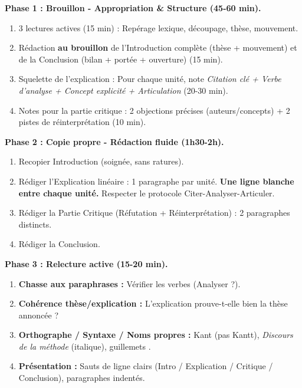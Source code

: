 \documentclass[11pt]{article}
\begin{document}
\begin{methode}
    \textbf{Phase 1 : Brouillon - Appropriation \& Structure (45-60 min).}
    \begin{enumerate}
        \item 3 lectures actives (15 min) : Repérage lexique, découpage, thèse, mouvement.
        \item Rédaction \textbf{au brouillon} de l'Introduction complète (thèse + mouvement) et de la Conclusion (bilan + portée + ouverture) (15 min).
        \item Squelette de l'explication : Pour chaque unité, note \emph{Citation clé + Verbe d'analyse + Concept explicité + Articulation} (20-30 min).
        \item Notes pour la partie critique : 2 objections précises (auteurs/concepts) + 2 pistes de réinterprétation (10 min).
    \end{enumerate}
    \textbf{Phase 2 : Copie propre - Rédaction fluide (1h30-2h).}
    \begin{enumerate}
        \item Recopier Introduction (soignée, sans ratures).
        \item Rédiger l'Explication linéaire : 1 paragraphe par unité. \textbf{Une ligne blanche entre chaque unité.} Respecter le protocole Citer-Analyser-Articuler.
        \item Rédiger la Partie Critique (Réfutation + Réinterprétation) : 2 paragraphes distincts.
        \item Rédiger la Conclusion.
    \end{enumerate}
    \textbf{Phase 3 : Relecture active (15-20 min).}
    \begin{enumerate}
        \item \textbf{Chasse aux paraphrases :} Vérifier les verbes (Analyser ?).
        \item \textbf{Cohérence thèse/explication :} L'explication prouve-t-elle bien la thèse annoncée ?
        \item \textbf{Orthographe / Syntaxe / Noms propres :} Kant (pas Kantt), \emph{Discours de la méthode} (italique), \guillemotleft guillemets \guillemotright.
        \item \textbf{Présentation :} Sauts de ligne clairs (Intro / Explication / Critique / Conclusion), paragraphes indentés.
    \end{enumerate}
\end{methode}
\end{document}

